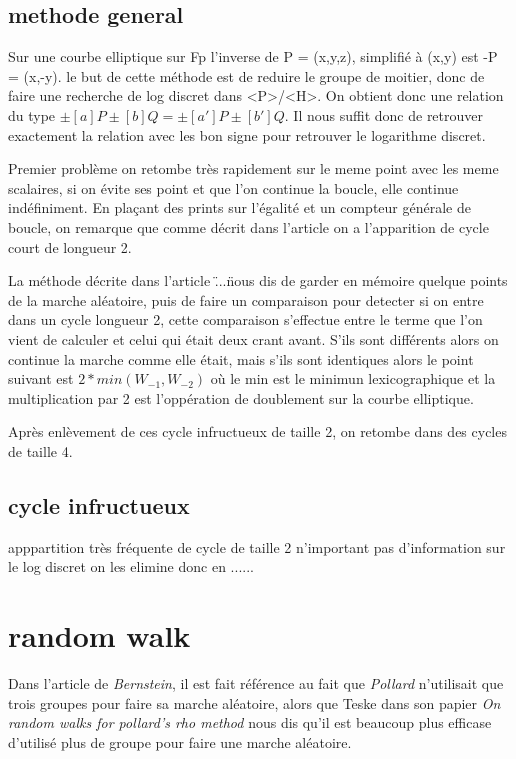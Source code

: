 \documentclass[a4paper,10pt]{report}
\begin{document}
\section{methode general}

Sur une courbe elliptique sur Fp l'inverse de P = (x,y,z), simplifié à (x,y) est -P = (x,-y). le but de cette méthode est de reduire le groupe de moitier,
donc de faire une recherche de log discret dans <P>/<H>. On obtient donc une relation du type $\pm[a]P \pm[b]Q = \pm[a']P \pm[b']Q$. Il nous suffit donc de retrouver exactement 
la relation avec les bon signe pour retrouver le logarithme discret.

Premier problème on retombe très rapidement sur le meme point avec les meme scalaires, si on évite ses point et que l'on continue la boucle, elle continue indéfiniment.
En plaçant des prints sur l'égalité et un compteur générale de boucle, on remarque que comme décrit dans l'article on a l'apparition de cycle court de longueur 2.

La méthode décrite dans l'article \" ...\" nous dis de garder en mémoire quelque points de la marche aléatoire, puis de faire un comparaison pour detecter si on entre dans un cycle
longueur 2, cette comparaison s'effectue entre le terme que l'on vient de calculer et celui qui était deux crant avant.
S'ils sont différents alors on continue la marche comme elle était, mais s'ils sont identiques alors le point suivant est $2*min(W_{-1},W_{-2})$ où le min est le minimun lexicographique et
la multiplication par 2 est l'oppération de doublement sur la courbe elliptique.

Après enlèvement de ces cycle infructueux de taille 2, on retombe dans des cycles de taille 4.

\section{cycle infructueux}

apppartition très fréquente de cycle de taille 2 n'important pas d'information sur le log discret on les elimine donc en ......

\chapter{random walk}

Dans l'article de \textit{Bernstein}, il est fait référence au fait que \textit{Pollard} n'utilisait que trois groupes pour faire sa marche aléatoire, 
alors que Teske dans son papier \textit{On random walks for pollard's rho method} nous dis qu'il est beaucoup plus efficase d'utilisé plus de groupe 
pour faire une marche aléatoire.
\end{document}
